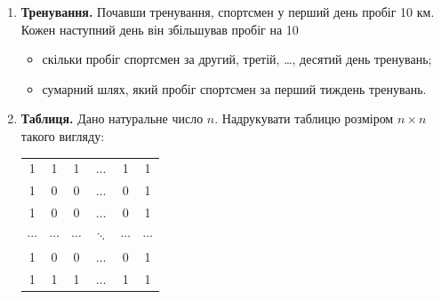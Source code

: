  


\begin{enumerate}
\item \textbf{Тренування.} Почавши тренування, спортсмен у перший день пробіг 10 км. Кожен наступний день він збільшував пробіг на 10%
\begin{itemize}[noitemsep, label=\faForward]
\item скільки пробіг спортсмен за другий, третій, \ldots, десятий день тренувань;
\item сумарний шлях, який пробіг спортсмен за перший тиждень тренувань.
\end{itemize}
\item \textbf{Таблиця.} Дано натуральне число $n$. Надрукувати таблицю розміром $n\times n$ такого вигляду:
{\ttfamily
\begin{center}
\setlength{\tabcolsep}{6pt}
\begin{tabular}{cccccc}
1 & 1 & 1 & $\ldots$ & 1 & 1 \\
1 & 0 & 0 & $\ldots$ & 0 & 1 \\
1 & 0 & 0 & $\ldots$ & 0 & 1  \\
$\cdots$ & $\cdots$ & $\cdots$ & $\ddots$ & $\cdots$ & $\cdots$\\
1 & 0 & 0 & $\ldots$ & 0 & 1 \\
1 & 1 & 1 & $\ldots$ & 1 & 1
\end{tabular}
\end{center}
}
\end{enumerate}

 


